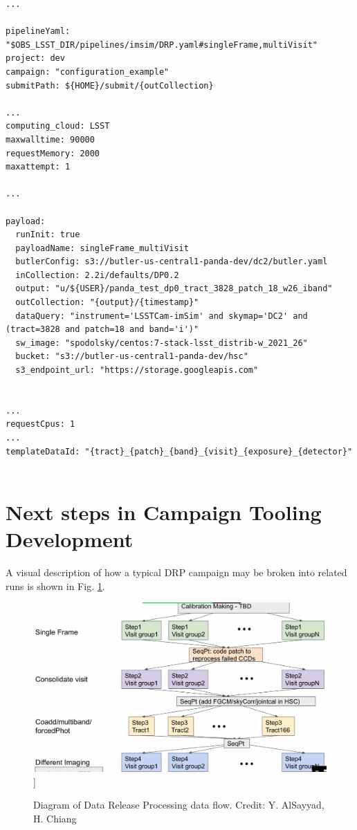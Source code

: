 \documentclass[DM,authoryear,toc]{lsstdoc}
\begin{document}
\begin{verbatim}
...

pipelineYaml: "$OBS_LSST_DIR/pipelines/imsim/DRP.yaml#singleFrame,multiVisit"
project: dev
campaign: "configuration_example"
submitPath: ${HOME}/submit/{outCollection}

...
computing_cloud: LSST
maxwalltime: 90000
requestMemory: 2000
maxattempt: 1

...

payload:
  runInit: true
  payloadName: singleFrame_multiVisit
  butlerConfig: s3://butler-us-central1-panda-dev/dc2/butler.yaml
  inCollection: 2.2i/defaults/DP0.2
  output: "u/${USER}/panda_test_dp0_tract_3828_patch_18_w26_iband"
  outCollection: "{output}/{timestamp}"
  dataQuery: "instrument='LSSTCam-imSim' and skymap='DC2' and (tract=3828 and patch=18 and band='i')"
  sw_image: "spodolsky/centos:7-stack-lsst_distrib-w_2021_26"
  bucket: "s3://butler-us-central1-panda-dev/hsc"
  s3_endpoint_url: "https://storage.googleapis.com"


...
requestCpus: 1
...
templateDataId: "{tract}_{patch}_{band}_{visit}_{exposure}_{detector}"


\end{verbatim}


\section{Next steps in Campaign Tooling Development}

A visual description of how a typical DRP campaign may be broken into
related runs is shown in Fig. \ref{WorkflowExampleRunSet}.

\begin{figure}
\includegraphics[width=\textwidth]{analdrp.png}]
\caption{Diagram of Data Release Processing data flow.
Credit: Y. AlSayyad, H. Chiang}
\label{WorkflowExampleRunSet}
\end{figure}
\end{document}
